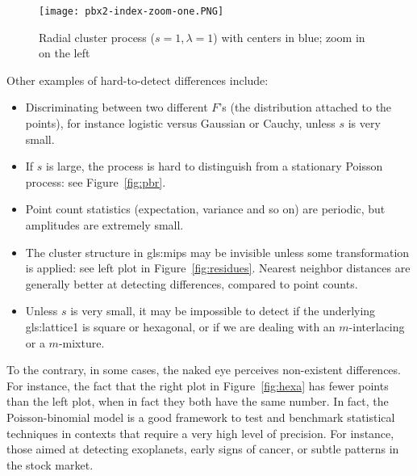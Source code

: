 \documentclass[10pt]{article}
\begin{document}
\begin{figure}[H]
\centering
\texttt{[image: pbx2-index-zoom-one.PNG]}  %
\caption{Radial cluster process ($s=1, \lambda=1$) with centers in blue; zoom in on the left}
\label{fig:pbr4c}
\end{figure}

\noindent Other examples of hard-to-detect differences include:
\begin{itemize}
\item Discriminating between two different $F$'s (the distribution attached to the points), for instance logistic versus Gaussian or Cauchy, unless $s$ is very small.
\item If $s$ is large, the process is hard to distinguish from a stationary Poisson process: see Figure~\ref{fig:pbr}.
\item Point count statistics (expectation, variance and so on) are periodic, but amplitudes are extremely small.
\item The cluster structure in \glspl{gls:mip} may be invisible unless some transformation is applied: see left plot in Figure~\ref{fig:residues}.
  \textcolor{index}{Nearest neighbor distances} are generally better at detecting differences, compared to point counts.
\item Unless $s$ is very small, it may be impossible to detect if the underlying \gls{gls:lattice1} is square or hexagonal, or if we are dealing with an
  $m$-interlacing or a \textcolor{index}{$m$-mixture}.
\end{itemize}

\noindent To the contrary, in some cases, the naked eye perceives non-existent differences. For instance, the fact that the right plot in Figure~\ref{fig:hexa} has fewer points than the left plot,
 when in fact they both have the same number. In fact, the Poisson-binomial model is a good framework to test and benchmark statistical techniques in contexts that require a very high
level of  precision. For instance, those aimed at detecting exoplanets, early signs of cancer, or subtle patterns in the stock market.

\end{document}
